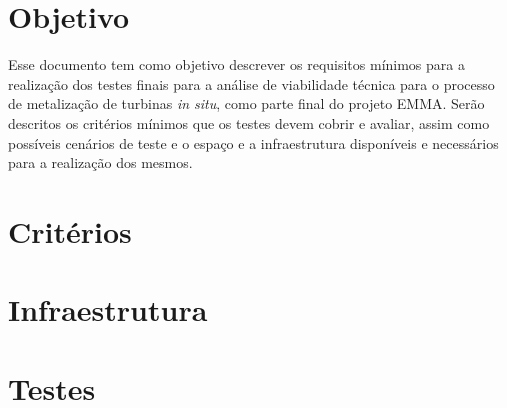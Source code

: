 \documentclass[12pt,a4paper]{article}
\begin{document}


\tableofcontents


\section{Objetivo}
Esse documento tem como objetivo descrever os requisitos mínimos para a
realização dos testes finais para a análise de viabilidade técnica para o
processo de metalização de turbinas \textit{in situ}, como parte final do
projeto EMMA.
Serão descritos os critérios mínimos que os testes devem cobrir e avaliar, assim
como possíveis cenários de teste e o espaço e a infraestrutura
disponíveis e necessários para a realização dos mesmos.

\section{Critérios}
\label{sec::criterios}


\section{Infraestrutura}


\section{Testes}

\end{document}
